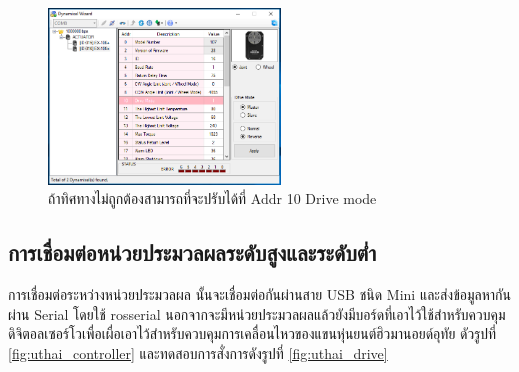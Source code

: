 \begin{figure}[!ht]
    \centering
    \includegraphics[width=0.55\textwidth]{chapter3/images/roboplus/roboplus7.PNG}
    \caption*{ถ้าทิศทางไม่ถูกต้องสามารถที่จะปรับได้ที่ Addr 10 Drive mode}
\end{figure}

\clearpage
\subsection{การเชื่อมต่อหน่วยประมวลผลระดับสูงและระดับต่ำ}
การเชื่อมต่อระหว่างหน่วยประมวลผล นั้นจะเชื่อมต่อกันผ่านสาย USB ชนิด Mini
และส่งข้อมูลหากันผ่าน Serial โดยใช้ rosserial นอกจากจะมีหน่วยประมวลผลแล้วยังมีบอร์ดที่เอาไว้ใช้สำหรับควบคุม
ดิจิตอลเซอร์โวเพื่อเผื่อเอาไว้สำหรับควบคุมการเคลื่อนไหวของแขนหุ่นยนต์ฮิวมานอยด์อุทัย
ดัวรูปที่ \ref{fig:uthai_controller} และทดสอบการสั่งการดังรูปที่ \ref{fig:uthai_drive} 

